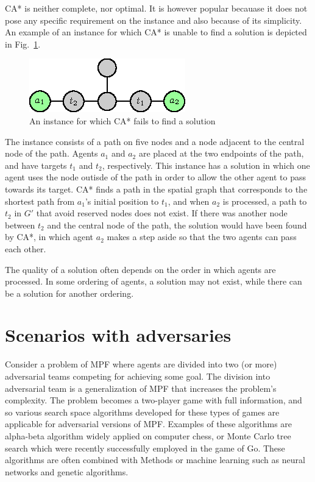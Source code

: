 CA* is neither complete, nor optimal. It is however popular becauase it does not pose any specific requirement on the instance and also because of its simplicity.
An example of an instance for which CA* is unable to find a solution is depicted in Fig.~\ref{fig:castarfail}.
\begin{figure}
\centering
	\includegraphics[scale=1.5]{figurer/castarfail.eps}
\caption{An instance for which CA* fails to find a solution}
\label{fig:castarfail}
\end{figure}
The instance consists of a path on five nodes and a node adjacent to the central node of the path.
Agents $a_1$ and $a_2$ are placed at the two endpoints of the path, and have targets $t_1$ and $t_2$, respectively.
This instance has a solution in which one agent uses the node outisde of the path in order to allow the other agent to pass towards its target.
CA* finds a path in the spatial graph that corresponds to the shortest path from $a_1$'s initial position to $t_1$, and when $a_2$ is processed,
a path to $t_2$ in $G'$ that avoid reserved nodes does not exist.
If there was another node between $t_2$ and the central node of the path, the solution would have been found by CA*, in which agent $a_2$ makes a step aside so that the two agents can pass each other.

The quality of a solution often depends on the order in which agents are processed. 
In some ordering of agents, a solution may not exist, while there can be a solution for another ordering.
\section{Scenarios with adversaries}

Consider a problem of MPF where agents are divided into two (or more) adversarial teams competing for achieving some goal.
The division into adversarial team is a generalization of MPF that increases the problem's complexity.
The problem becomes a two-player game with full information, and so various search space algorithms developed for these types of games are applicable for adversarial versions of MPF.
Examples of these algorithms are alpha-beta algorithm widely applied on computer chess, or Monte Carlo tree search which were recently successfully employed in the game of Go.
These algorithms are often combined with Methods or machine learning such as neural networks and genetic algorithms. 

